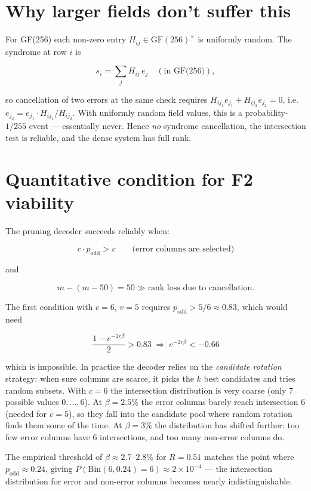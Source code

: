 \documentclass[11pt]{article}
\begin{document}
\section{Why larger fields don't suffer this}

For GF(256) each non-zero entry $H_{ij}\in\text{GF}(256)^\times$ is uniformly
random.  The syndrome at row $i$ is

\[
s_i = \sum_{j} H_{ij}\, e_j \quad (\text{in GF(256)}),
\]

so cancellation of two errors at the same check requires
$H_{i j_1}e_{j_1} + H_{i j_2}e_{j_2} = 0$, i.e.\
$e_{j_2} = e_{j_1}\cdot H_{i j_1}/H_{i j_2}$.  With uniformly random
field values, this is a probability-$1/255$ event — essentially never.
Hence \emph{no} syndrome cancellation, the intersection test is reliable,
and the dense system has full rank.

\section{Quantitative condition for F2 viability}

The pruning decoder succeeds reliably when:

\[
c \cdot p_\text{odd} > v \qquad\text{(error columns are selected)}
\]

and

\[
m - (m - 50) = 50 \gg \text{rank loss due to cancellation}.
\]

The first condition with $c=6$, $v=5$ requires $p_\text{odd} > 5/6 \approx 0.83$,
which would need

\[
\frac{1-e^{-2r\beta}}{2} > 0.83 \;\Longrightarrow\; e^{-2r\beta} < -0.66
\]

which is impossible.  In practice the decoder relies on the \emph{candidate
rotation} strategy: when sure columns are scarce, it picks the $k$ best
candidates and tries random subsets.  With $c=6$ the intersection distribution
is very coarse (only $7$ possible values $0,\dots,6$).  At $\beta=2.5\%$ the
error columns barely reach intersection $6$ (needed for $v=5$), so they fall
into the candidate pool where random rotation finds them some of the time.
At $\beta=3\%$ the distribution has shifted further: too few error columns
have $6$ intersections, and too many non-error columns do.

The empirical threshold of $\beta\approx 2.7$--$2.8\%$ for $R=0.51$ matches
the point where $p_\text{odd} \approx 0.24$, giving
$P(\mathrm{Bin}(6,0.24)=6) \approx 2\times10^{-4}$ — the intersection
distribution for error and non-error columns becomes nearly indistinguishable.
\end{document}
